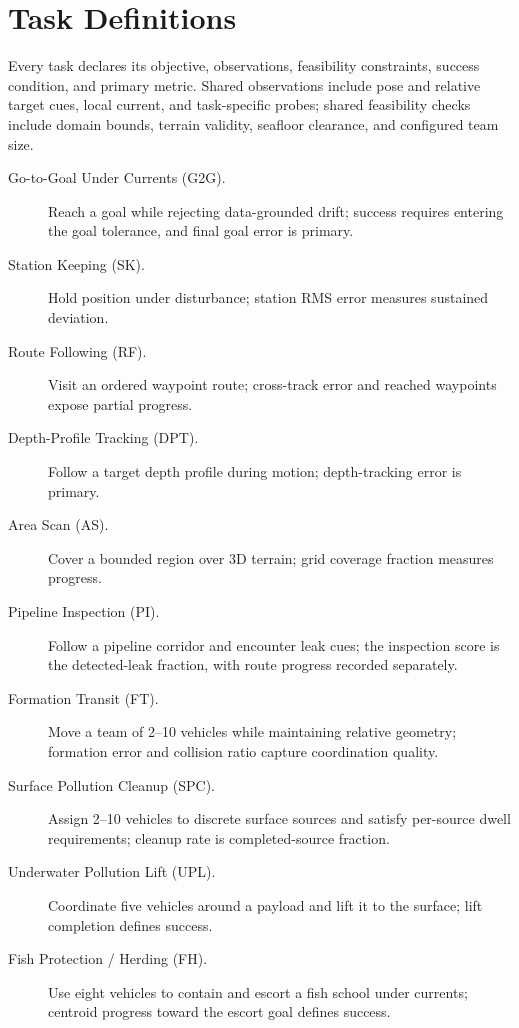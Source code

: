 \section{Task Definitions}
\label{app:tasks}

Every task declares its objective, observations, feasibility constraints, success condition, and primary metric. Shared observations include pose and relative target cues, local current, and task-specific probes; shared feasibility checks include domain bounds, terrain validity, seafloor clearance, and configured team size.

\begin{description}
\item[Go-to-Goal Under Currents (G2G).] Reach a goal while rejecting data-grounded drift; success requires entering the goal tolerance, and final goal error is primary.
\item[Station Keeping (SK).] Hold position under disturbance; station RMS error measures sustained deviation.
\item[Route Following (RF).] Visit an ordered waypoint route; cross-track error and reached waypoints expose partial progress.
\item[Depth-Profile Tracking (DPT).] Follow a target depth profile during motion; depth-tracking error is primary.
\item[Area Scan (AS).] Cover a bounded region over 3D terrain; grid coverage fraction measures progress.
\item[Pipeline Inspection (PI).] Follow a pipeline corridor and encounter leak cues; the inspection score is the detected-leak fraction, with route progress recorded separately.
\item[Formation Transit (FT).] Move a team of 2--10 vehicles while maintaining relative geometry; formation error and collision ratio capture coordination quality.
\item[Surface Pollution Cleanup (SPC).] Assign 2--10 vehicles to discrete surface sources and satisfy per-source dwell requirements; cleanup rate is completed-source fraction.
\item[Underwater Pollution Lift (UPL).] Coordinate five vehicles around a payload and lift it to the surface; lift completion defines success.
\item[Fish Protection / Herding (FH).] Use eight vehicles to contain and escort a fish school under currents; centroid progress toward the escort goal defines success.
\end{description}

